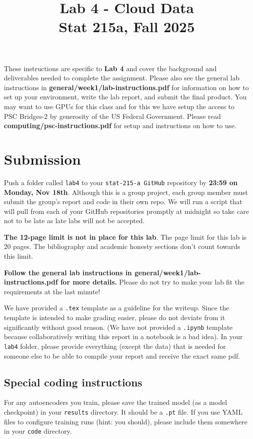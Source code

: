 \documentclass[letterpaper,12pt]{article}
\title{Lab 4 - Cloud Data\\Stat 215a, Fall 2025\vspace{-2em}}
\date{}
\begin{document}
\maketitle

These instructions are specific to \textbf{Lab 4} and cover the background and deliverables needed to complete the assignment. Please also see the general lab instructions in \textbf{general/week1/lab-instructions.pdf} for information on how to set up your environment, write the lab report, and submit the final product. You may want to use GPUs for this class and for this we have setup the access to PSC Bridges-2 by generosity of the US Federal Government. Please read \textbf{computing/psc-instructions.pdf} for setup and instructions on how to use.

\tableofcontents

\section{Submission}
Push a folder called \texttt{lab4} to your \texttt{stat-215-a GitHub} repository by \textbf{23:59 on Monday, Nov 18th}. Although this is a group project, each group member must submit the group's report and code in their own repo. We will run a script that will pull from each of your GitHub repositories promptly at midnight so take care not to be late as late labs will not be accepted.

\textbf{The 12-page limit is not in place for this lab}. The page limit for this lab is 20 pages. The bibliography and academic honesty sections don't count towards this limit.

\textbf{Follow the general lab instructions in general/week1/lab-instructions.pdf for more details.} Please do not try to make your lab fit the requirements at the last minute!

We have provided a \texttt{.tex} template as a guideline for the writeup. Since the template is intended to make grading easier, please do not deviate from it significantly without good reason. (We have not provided a \texttt{.ipynb} template because collaboratively writing this report in a notebook is a bad idea). In your \texttt{lab4} folder, please provide everything (except the data) that is needed for someone else to be able to compile your report and receive the exact same pdf.

\subsection{Special coding instructions}
For any autoencoders you train, please save the trained model (as a model checkpoint) in your \texttt{results} directory. It should be a \texttt{.pt} file. If you use YAML files to configure training runs (hint: you should), please include them somewhere in your \texttt{code} directory.
\end{document}
